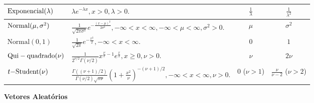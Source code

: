 \documentclass[10pt]{article}%
\begin{document}
\begin{table*}[ht]
\begin{tabular}{@{}llcc@{}}
\midrule
${\rm Exponencial}(\lambda)$ &  $\displaystyle{\lambda e^{-\lambda x}, x > 0, \lambda > 0.}$ & $\displaystyle{\frac{1}{\lambda}}$ & $\displaystyle{\frac{1}{\lambda^2}}$\\
\midrule
${\rm Normal}(\mu, \sigma^2)$ & $\displaystyle{\frac{1}{\sqrt{2\pi\sigma^2}}e^{-\frac{(x-\mu)^2}{2\sigma^2}}, -\infty < x < \infty, -\infty < \mu < \infty,  \sigma^2 > 0.}$& $\mu$ & $\sigma^2$\\
\midrule
$\mbox{Normal}(0, 1)$ & $\displaystyle{\frac{1}{\sqrt{2\pi}}e^{-\frac{x^2}{2}}, -\infty < x < \infty.}$& $0$ & $1$\\
\midrule
${\rm Qui-quadrado}(\nu)$ & $\displaystyle{\frac{1}{2^{\nu/2}\Gamma(\nu/2)}x^{\frac{\nu}{x} - 1}e^{\frac{x}{2}}, x \geq 0, \nu > 0.}$& $\nu$ & $2\nu$\\
\midrule
$t{\rm -Student}(\nu)$ & $\displaystyle{\frac{\Gamma((\nu+1)/2)}{\Gamma(\nu/2)\sqrt{\pi\nu}}\left(1+\frac{x^2}{\nu}\right)^{-(\nu+1)/2}, -\infty < x < \infty, \nu > 0.}$& $0$ ($\nu > 1$)& $\frac{\nu}{\nu - 2}$ ($\nu > 2$)\\
\end{tabular}
\end{table*}

\textbf{Vetores Aleatórios}
\end{document}
